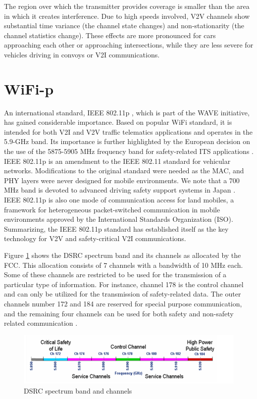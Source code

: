 The region over which the transmitter provides coverage is smaller than the area in which it creates interference. Due to high speeds involved, V2V channels show substantial time variance (the channel state changes) and non-stationarity (the channel statistics change). These effects are more pronounced for cars approaching each other or approaching intersections, while they are less severe for vehicles driving in convoys or V2I communications.

\section{WiFi-p}
An international standard, IEEE 802.11p \cite{ieee1997wireless}, which is part of the WAVE initiative, has gained considerable importance. Based on popular WiFi standard, it is intended for both V2I and V2V traffic telematics applications and operates in the 5.9-GHz band. Its importance is further highlighted by the European decision on the use of the 5875-5905 MHz frequency band for safety-related ITS applications \cite{reding2007commission}. IEEE 802.11p is an amendment to the IEEE 802.11 standard for vehicular networks. Modifications to the original standard were needed as the MAC, and PHY layers were never designed for mobile environments. We note that a 700 MHz band is devoted to advanced driving safety support systems in Japan \cite{mecklenbrauker2011vehicular}. IEEE 802.11p is also one mode of communication access for land mobiles, a framework for heterogeneous packet-switched communication in mobile environments approved by the International Standards Organization (ISO). Summarizing, the IEEE 802.11p standard has established itself as the key technology for V2V and safety-critical V2I communications.

Figure \ref{fig:DSRC spectrum band and channels} shows the DSRC spectrum band and its channels as allocated by the FCC. This allocation consists of 7 channels with a bandwidth of 10 MHz each. Some of these channels are restricted to be used for the transmission of a particular type of information. For instance, channel 178 is the control channel and can only be utilized for the transmission of safety-related data. The outer channels number 172 and 184 are reserved for special purpose communication, and the remaining four channels can be used for both safety and non-safety related communication \cite{chen2009ieee}.


\begin{figure}[h!]
    \includegraphics[width=1\textwidth]{figures/DSRC spectrum band and channels.png}
    \centering
    \caption[DSRC spectrum band and channels]{DSRC spectrum band and channels \protect\cite{chen2009ieee}}
    \label{fig:DSRC spectrum band and channels}    
\end{figure}



